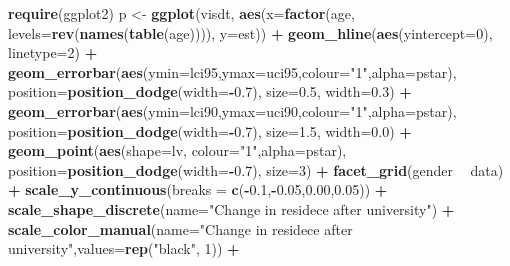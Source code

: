 \documentclass[
]{article}
\newenvironment{Shaded}{\begin{snugshade}}{\end{snugshade}}
\newcommand{\DataTypeTok}[1]{\textcolor[rgb]{0.13,0.29,0.53}{#1}}
\newcommand{\DecValTok}[1]{\textcolor[rgb]{0.00,0.00,0.81}{#1}}
\newcommand{\FloatTok}[1]{\textcolor[rgb]{0.00,0.00,0.81}{#1}}
\newcommand{\KeywordTok}[1]{\textcolor[rgb]{0.13,0.29,0.53}{\textbf{#1}}}
\newcommand{\NormalTok}[1]{#1}
\newcommand{\OperatorTok}[1]{\textcolor[rgb]{0.81,0.36,0.00}{\textbf{#1}}}
\newcommand{\StringTok}[1]{\textcolor[rgb]{0.31,0.60,0.02}{#1}}
\begin{document}
\begin{Shaded}
\begin{Highlighting}[]
\KeywordTok{require}\NormalTok{(ggplot2)}
\NormalTok{p <-}\StringTok{ }\KeywordTok{ggplot}\NormalTok{(visdt, }\KeywordTok{aes}\NormalTok{(}\DataTypeTok{x=}\KeywordTok{factor}\NormalTok{(age, }\DataTypeTok{levels=}\KeywordTok{rev}\NormalTok{(}\KeywordTok{names}\NormalTok{(}\KeywordTok{table}\NormalTok{(age)))), }\DataTypeTok{y=}\NormalTok{est)) }\OperatorTok{+}
\StringTok{  }\KeywordTok{geom_hline}\NormalTok{(}\KeywordTok{aes}\NormalTok{(}\DataTypeTok{yintercept=}\DecValTok{0}\NormalTok{), }\DataTypeTok{linetype=}\DecValTok{2}\NormalTok{) }\OperatorTok{+}
\StringTok{  }\KeywordTok{geom_errorbar}\NormalTok{(}\KeywordTok{aes}\NormalTok{(}\DataTypeTok{ymin=}\NormalTok{lci95,}\DataTypeTok{ymax=}\NormalTok{uci95,}\DataTypeTok{colour=}\StringTok{"1"}\NormalTok{,}\DataTypeTok{alpha=}\NormalTok{pstar), }
                \DataTypeTok{position=}\KeywordTok{position_dodge}\NormalTok{(}\DataTypeTok{width=}\OperatorTok{-}\FloatTok{0.7}\NormalTok{), }\DataTypeTok{size=}\FloatTok{0.5}\NormalTok{, }\DataTypeTok{width=}\FloatTok{0.3}\NormalTok{) }\OperatorTok{+}
\StringTok{  }\KeywordTok{geom_errorbar}\NormalTok{(}\KeywordTok{aes}\NormalTok{(}\DataTypeTok{ymin=}\NormalTok{lci90,}\DataTypeTok{ymax=}\NormalTok{uci90,}\DataTypeTok{colour=}\StringTok{"1"}\NormalTok{,}\DataTypeTok{alpha=}\NormalTok{pstar),}
                \DataTypeTok{position=}\KeywordTok{position_dodge}\NormalTok{(}\DataTypeTok{width=}\OperatorTok{-}\FloatTok{0.7}\NormalTok{), }\DataTypeTok{size=}\FloatTok{1.5}\NormalTok{, }\DataTypeTok{width=}\FloatTok{0.0}\NormalTok{) }\OperatorTok{+}
\StringTok{  }\KeywordTok{geom_point}\NormalTok{(}\KeywordTok{aes}\NormalTok{(}\DataTypeTok{shape=}\NormalTok{lv, }\DataTypeTok{colour=}\StringTok{"1"}\NormalTok{,}\DataTypeTok{alpha=}\NormalTok{pstar),}
             \DataTypeTok{position=}\KeywordTok{position_dodge}\NormalTok{(}\DataTypeTok{width=}\OperatorTok{-}\FloatTok{0.7}\NormalTok{), }\DataTypeTok{size=}\DecValTok{3}\NormalTok{) }\OperatorTok{+}
\StringTok{  }\KeywordTok{facet_grid}\NormalTok{(gender }\OperatorTok{~}\StringTok{ }\NormalTok{data) }\OperatorTok{+}
\StringTok{  }\KeywordTok{scale_y_continuous}\NormalTok{(}\DataTypeTok{breaks =} \KeywordTok{c}\NormalTok{(}\OperatorTok{-}\FloatTok{0.1}\NormalTok{,}\OperatorTok{-}\FloatTok{0.05}\NormalTok{,}\FloatTok{0.00}\NormalTok{,}\FloatTok{0.05}\NormalTok{)) }\OperatorTok{+}\StringTok{ }
\StringTok{  }\KeywordTok{scale_shape_discrete}\NormalTok{(}\DataTypeTok{name=}\StringTok{"Change in residece after university"}\NormalTok{) }\OperatorTok{+}
\StringTok{  }\KeywordTok{scale_color_manual}\NormalTok{(}\DataTypeTok{name=}\StringTok{"Change in residece after university"}\NormalTok{,}\DataTypeTok{values=}\KeywordTok{rep}\NormalTok{(}\StringTok{"black"}\NormalTok{, }\DecValTok{1}\NormalTok{)) }\OperatorTok{+}

\end{Highlighting}
\end{Shaded}
\end{document}
